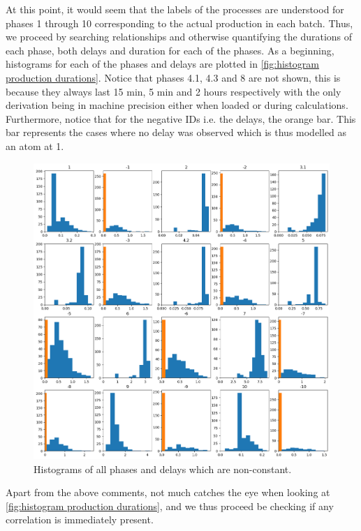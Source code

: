 \documentclass[../Thesis.tex]{subfiles}
\begin{document}
At this point, it would seem that the labels of the processes are understood for phases 1 through 10 corresponding to the actual production in each batch. Thus, we proceed by searching relationships and otherwise quantifying the durations of each phase, both delays and duration for each of the phases. As a beginning, histograms for each of the phases and delays are plotted in \autoref{fig:histogram production durations}. Notice that phases 4.1, 4.3 and 8 are not shown, this is because they always last 15 min, 5 min and 2 hours respectively with the only derivation being in machine precision either when loaded or during calculations. Furthermore, notice that for the negative IDs i.e. the delays, the orange bar. This bar represents the cases where no delay was observed which is thus modelled as an atom at 1.

\begin{figure}[H]
    \centering
    \includegraphics[width=\linewidth]{figures/Multiple cycles data/Adding of solids/hisstograms w atoms.png}
    \caption{Histograms of all phases and delays which are non-constant.}
    \label{fig:histogram production durations}
\end{figure}

Apart from the above comments, not much catches the eye when looking at \autoref{fig:histogram production durations}, and we thus proceed be checking if any correlation is immediately present.
\end{document}
